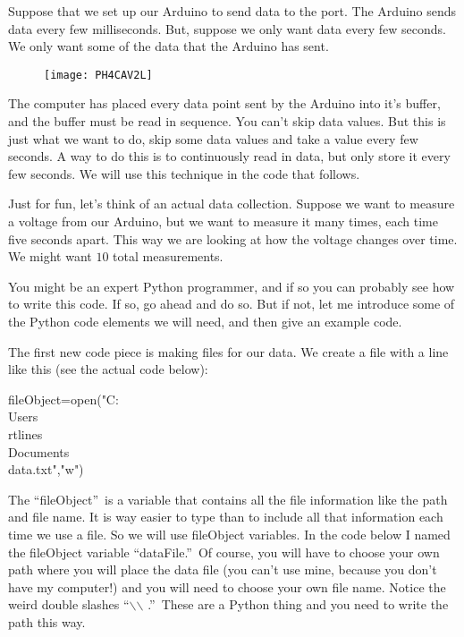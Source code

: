 Suppose that we set up our Arduino to send data to the port. The Arduino
sends data every few milliseconds. But, suppose we only want data every few
seconds. We only want some of the data that the Arduino has sent. \begin{figure}[h!]
\texttt{[image: PH4CAV2L]}
\end{figure}%
The computer has placed every data point sent by the Arduino into it's
buffer, and the buffer must be read in sequence. You can't skip data values.
But this is just what we want to do, skip some data values and take a value
every few seconds. A way to do this is to continuously read in data, but
only store it every few seconds. We will use this technique in the code that
follows.

Just for fun, let's think of an actual data collection. Suppose we want to
measure a voltage from our Arduino, but we want to measure it many times,
each time five seconds apart. This way we are looking at how the voltage
changes over time. We might want $10$ total measurements.

You might be an expert Python programmer, and if so you can probably see how
to write this code. If so, go ahead and do so. But if not, let me introduce
some of the Python code elements we will need, and then give an example code.

The first new code piece is making files for our data. We create a file with
a line like this (see the actual code below):%
\begin{python}
	fileObject=open("C:\\Users\\rtlines\\Documents\\data.txt","w")	
\end{python}

The \textquotedblleft fileObject\textquotedblright\ is a variable that
contains all the file information like the path and file name. It is way
easier to type than to include all that information each time we use a file.
So we will use fileObject variables. In the code below I named the
fileObject variable \textquotedblleft dataFile.\textquotedblright\ Of
course, you will have to choose your own path where you will place the data
file (you can't use mine, because you don't have my computer!) and you will
need to choose your own file name. Notice the weird double slashes
\textquotedblleft $\backslash$$\backslash$%
.\textquotedblright\ These are a Python thing and you need to write the path
this way.

